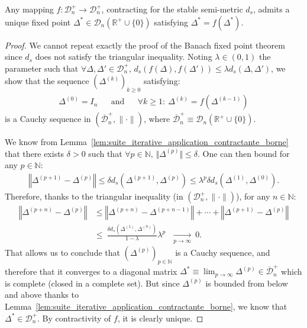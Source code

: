 \documentclass[a4papaer, titlepage]{book}
\begin{document}
\begin{theorem}\label{the:point_fixe_fonction_contractante_de_D_n_borne_superieurement}
  Any mapping $f: \mathcal D_n^+\to \mathcal D_n^+$, contracting for the stable semi-metric $d_s$, admits a unique fixed point $\Delta^*\in\mathcal D_n(\mathbb R^+ \cup \{0\})$ satisfying $\Delta^* =  f(\Delta^*)$.
\end{theorem}
\begin{proof}%
  We cannot repeat exactly the proof of the Banach fixed point theorem since $d_s$ does not satisfy the triangular inequality. 
  Noting $\lambda \in (0,1)$ the parameter such that $\forall \Delta,\Delta' \in \mathcal D_n^+$, $d_s(f(\Delta) , f(\Delta')) \leq \lambda d_s(\Delta,\Delta')$, we show that the sequence $(\Delta^{(k)})_{k\geq 0}$ satisfying: 
  \begin{align*}
    \Delta^{(0)} = I_n&
    &\text{and}&
    &\forall k\geq 1: \ \Delta^{(k)} = f(\Delta^{(k-1)})
   \end{align*}
   is a Cauchy sequence in $(\overline{\mathcal D}_n^+ ,\|\cdot \|)$, where $\overline{\mathcal D}_n^+ \equiv \mathcal D_n(\mathbb R^+ \cup \{0\})$. 


 We know from Lemma~\ref{lem:suite_iterative_application_contractante_borne} that there exists $\delta>0$ such that $\forall p \in \mathbb N$, $\Vert \Delta^{(p)} \Vert \leq \delta$. One can then bound for any $p \in \mathbb N$:
  \begin{align*}
      \left\Vert \Delta^{(p+1)}-\Delta^{(p)}\right\Vert\leq \delta
      d_s(\Delta^{(p+1)},\Delta^{(p)})
      \leq \lambda^p \delta d_s(\Delta^{(1)},\Delta^{(0)}).
  \end{align*}
  Therefore, thanks to the triangular inequality (in $(\mathcal D_n^+ ,\|\cdot \|)$), for any $n \in \mathbb N$:
  \begin{align*}
    \left\Vert\Delta^{(p+n)} - \Delta^{(p)}\right\Vert
    &\leq \left\Vert\Delta^{(p+n)} - \Delta^{(p+n-1)}\right\Vert+\cdots + \left\Vert\Delta^{(p+1)} - \Delta^{(p)}\right\Vert \\
    &\leq \  \frac{\delta d_s(\Delta^{(1)},\Delta^{(0)})}{1-\lambda} \lambda^p \ \ \ \underset{p \to \infty}{\longrightarrow} \ 0.
  \end{align*}
  That allows us to conclude that $(\Delta^{(p)})_{p\in \mathbb N}$ is a Cauchy sequence, and therefore that it converges to a diagonal matrix $\Delta^* \equiv \lim_{p \to \infty} \Delta^{(p)} \in \overline{\mathcal D}_n^+$ which is complete (closed in a complete set). But since $\Delta^{(p)}$ is bounded from below and above thanks to Lemma~\ref{lem:suite_iterative_application_contractante_borne}, we know that $\Delta^* \in \mathcal D_n^+$. By contractivity of $f$, it is clearly unique.
\end{proof}
\end{document}
